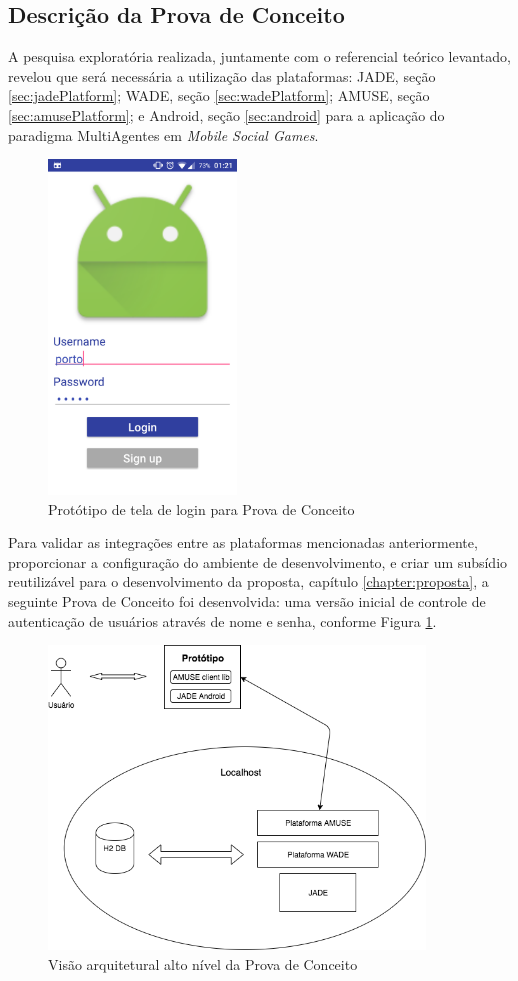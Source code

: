   \subsection{Descrição da Prova de Conceito}
  \label{subsec:descconceito}
  A pesquisa exploratória realizada, juntamente com o referencial teórico
  levantado, revelou que será necessária a utilização das plataformas: JADE, seção \ref{sec:jadePlatform}; WADE, seção \ref{sec:wadePlatform}; AMUSE, seção \ref{sec:amusePlatform}; e Android, seção \ref{sec:android} para a aplicação do paradigma MultiAgentes em \textit{Mobile Social Games}.

  \begin{figure}[h]
    \centering
    \includegraphics[width=5cm]{figuras/login_screen}
    \caption{Protótipo de tela de login para Prova de Conceito}
    \label{figura:login_screen}
  \end{figure}

  Para validar as integrações entre as plataformas mencionadas anteriormente,
  proporcionar a configuração do ambiente de desenvolvimento, e criar um
  subsídio reutilizável para o desenvolvimento da proposta, capítulo
  \ref{chapter:proposta}, a seguinte Prova de Conceito foi desenvolvida: uma
  versão inicial de controle de autenticação de usuários através de nome e
  senha, conforme Figura \ref{figura:login_screen}.

  \begin{figure}[h]
    \centering
    \includegraphics[width=10cm]{figuras/platforms_overview}
    \caption{Visão arquitetural alto nível da Prova de Conceito}
    \label{figura:platforms_overview}
  \end{figure}

